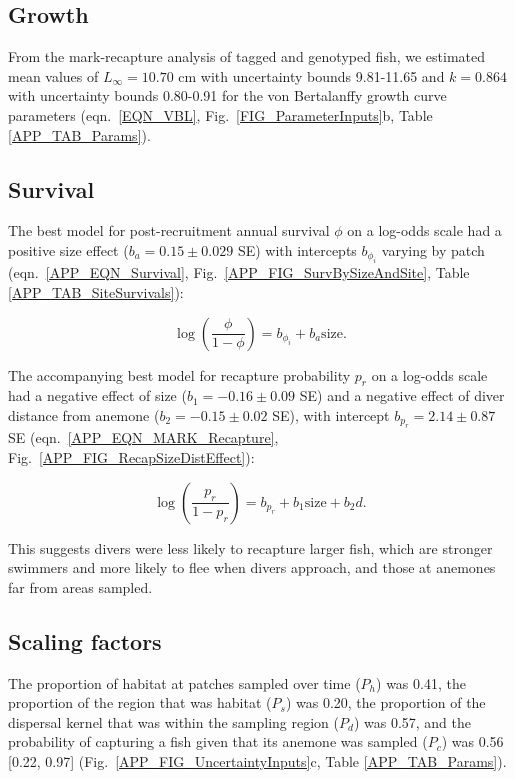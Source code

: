 \documentclass[12pt, oneside]{article}   	%
\begin{document}
\subsection{Growth} \label{APP_SEC_RESULTS_Growth}

From the mark-recapture analysis of tagged and genotyped fish, we estimated mean values of $L_\infty = 10.70$ cm with uncertainty bounds 9.81-11.65 and $k = 0.864$ with uncertainty bounds 0.80-0.91 for the von Bertalanffy growth curve parameters (eqn.\ \ref{EQN_VBL}, Fig.\ \ref{FIG_ParameterInputs}b, Table \ref{APP_TAB_Params}). 

\subsection{Survival} \label{APP_SEC_RESULTS_Survival}

The best model for post-recruitment annual survival $\phi$ on a log-odds scale had a positive size effect ($b_a = 0.15 \pm 0.029$ SE) with intercepts $b_{\phi_i}$ varying by patch (eqn.\ \ref{APP_EQN_Survival}, Fig.\ \ref{APP_FIG_SurvBySizeAndSite}, Table \ref{APP_TAB_SiteSurvivals}):

\begin{equation}
\log(\frac{\phi}{1-\phi}) = b_{\phi_i} + b_a\text{size}. \label{APP_EQN_Survival}
\end{equation}

The accompanying best model for recapture probability $p_r$ on a log-odds scale had a negative effect of size ($b_1 = -0.16 \pm 0.09$ SE) and a negative effect of diver distance from anemone ($b_2 = -0.15 \pm 0.02$ SE), with intercept $b_{p_r} = 2.14 \pm 0.87$ SE (eqn.\ \ref{APP_EQN_MARK_Recapture}, Fig.\ \ref{APP_FIG_RecapSizeDistEffect}):

\begin{equation}
\log(\frac{p_r}{1-p_r}) = b_{p_r} + b_1\text{size} + b_2d. \label{APP_EQN_MARK_Recapture}
\end{equation}

This suggests divers were less likely to recapture larger fish, which are stronger swimmers and more likely to flee when divers approach, and those at anemones far from areas sampled.

\subsection{Scaling factors} \label{APP_SEC_RESULTS_ScalingFactors}

The proportion of habitat at patches sampled over time ($P_h$) was 0.41, the proportion of the region that was habitat ($P_s$) was 0.20, the proportion of the dispersal kernel that was within the sampling region ($P_d$) was 0.57, and the probability of capturing a fish given that its anemone was sampled ($P_c$) was 0.56 [0.22, 0.97] (Fig.\ \ref{APP_FIG_UncertaintyInputs}c, Table \ref{APP_TAB_Params}).
\end{document}
